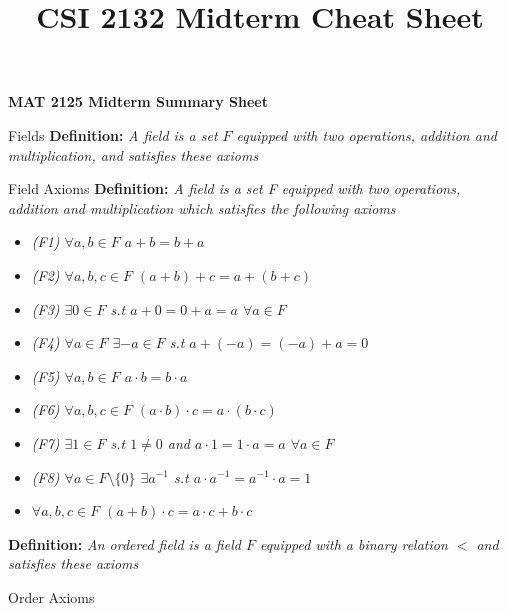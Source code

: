 \documentclass{article}
\title{CSI 2132 Midterm Cheat Sheet}
\begin{document}
\begin{center}{\large{\textbf{MAT 2125 Midterm Summary Sheet}}}\\
\end{center}




\begin{multicols*}{3}

\begin{blackbox}{Fields}
    \textbf{Definition:} \textit{A \emph{field} is a set $F$ equipped with two operations, addition and multiplication, and satisfies these axioms}
      \begin{bluebox}{Field Axioms}
          \textbf{Definition:} \textit{A \emph{field} is a set F equipped with two operations, addition and multiplication which satisfies the following axioms}
                \begin{itemize}
                    \item \textit{(F1) $\forall a,b \in F$ $a + b = b + a$ }
                    \item \textit{(F2) $\forall a,b,c \in F$ $(a + b) + c =  a + (b + c)$}
                    \item \textit{(F3) $\exists 0 \in F$ s.t  $a + 0 = 0 + a = a$ $\forall a \in F$}
                    \item \textit{(F4) $\forall a \in F$ $\exists -a \in F$ s.t $a + (-a) = (-a) + a = 0$}
                    \item \textit{(F5) $\forall a,b \in F$ $a\cdot b = b \cdot a$}
                    \item \textit{(F6) $\forall a,b,c \in F$ $(a\cdot b)\cdot c = a \cdot(b\cdot c)$}
                    \item \textit{(F7) $\exists 1 \in F$ s.t $1 \neq 0$ and $a\cdot 1 = 1\cdot a = a$ $\forall a \in F$}
                    \item \textit{(F8) $\forall a \in F\setminus\{0\}$ $\exists a^{-1}$ s.t $a \cdot a^{-1} = a^{-1} \cdot a = 1$}
                    \item \textit{$\forall a,b,c \in F$ $(a+b)\cdot c = a \cdot c + b\cdot c$}
                \end{itemize}
    \end{bluebox}
    \textbf{Definition:} \textit{An \emph{ordered field} is a field $F$ equipped with a binary relation $<$ and satisfies these axioms}
    \begin{bluebox}{Order Axioms}
         \begin{itemize}

\end{itemize}
\end{bluebox}
\end{blackbox}
\end{multicols*}
\end{document}
